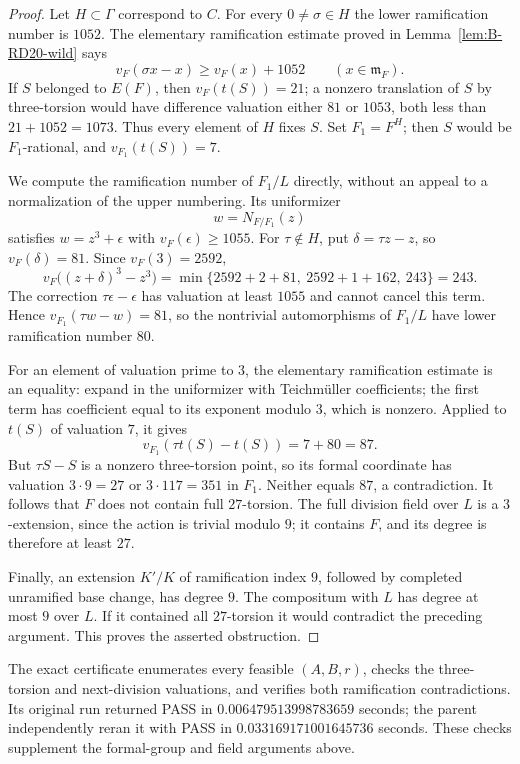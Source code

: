 \begin{proof}
Let $H\subset\Gamma$ correspond to $C$.  For every $0\ne\sigma\in H$ the lower ramification number is $1052$.  The elementary ramification estimate proved in Lemma~\ref{lem:B-RD20-wild} says
\[
 v_F(\sigma x-x)\geq v_F(x)+1052\qquad(x\in\mathfrak m_F).
\]
If $S$ belonged to $E(F)$, then $v_F(t(S))=21$; a nonzero translation of $S$ by three-torsion would have difference valuation either $81$ or $1053$, both less than $21+1052=1073$.  Thus every element of $H$ fixes $S$.  Set $F_1=F^H$; then $S$ would be $F_1$-rational, and $v_{F_1}(t(S))=7$.

We compute the ramification number of $F_1/L$ directly, without an appeal to a normalization of the upper numbering.  Its uniformizer
\[
                             w=N_{F/F_1}(z)
\]
satisfies $w=z^3+\epsilon$ with $v_F(\epsilon)\geq1055$.
For $\tau\notin H$, put $\delta=\tau z-z$, so $v_F(\delta)=81$.
Since $v_F(3)=2592$,
\[
 v_F\bigl((z+\delta)^3-z^3\bigr)
   =\min\{2592+2+81,\ 2592+1+162,\ 243\}=243.
\]
The correction $\tau\epsilon-\epsilon$ has valuation at least $1055$ and cannot cancel this term.  Hence
$v_{F_1}(\tau w-w)=81$, so the nontrivial automorphisms of $F_1/L$ have lower ramification number $80$.

For an element of valuation prime to $3$, the elementary ramification estimate is an equality: expand in the uniformizer with Teichm\"uller coefficients; the first term has coefficient equal to its exponent modulo $3$, which is nonzero.  Applied to $t(S)$ of valuation $7$, it gives
\[
                         v_{F_1}(\tau t(S)-t(S))=7+80=87.
\]
But $\tau S-S$ is a nonzero three-torsion point, so its formal coordinate has valuation $3\cdot9=27$ or $3\cdot117=351$ in $F_1$.  Neither equals $87$, a contradiction.
It follows that $F$ does not contain full $27$-torsion.  The full division field over $L$ is a $3$-extension, since the action is trivial modulo $9$; it contains $F$, and its degree is therefore at least $27$.

Finally, an extension $K'/K$ of ramification index $9$, followed by completed unramified base change, has degree $9$.  The compositum with $L$ has degree at most $9$ over $L$.  If it contained all $27$-torsion it would contradict the preceding argument.  This proves the asserted obstruction.
\end{proof}

\begin{remark}\label{auto:B:c83d5f781371}

The exact certificate 
enumerates every feasible $(A,B,r)$, checks the three-torsion and
next-division valuations, and verifies both ramification contradictions.
Its original run returned PASS in $0.006479513998783659$ seconds;
the parent independently reran it with PASS in $0.033169171001645736$ seconds.
These checks supplement the formal-group and field arguments above.
\end{remark}


